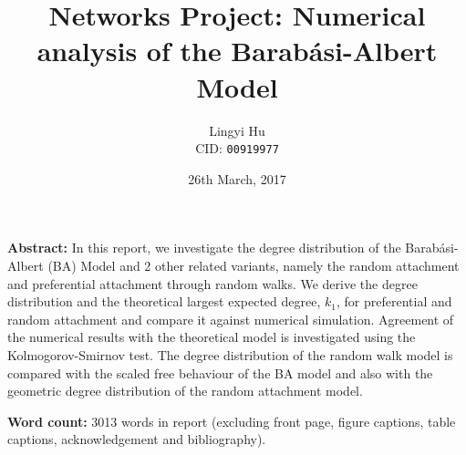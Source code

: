 


\title{Networks Project: Numerical analysis of the Barab\'asi-Albert Model}
\date{26th March, 2017}
\author{Lingyi Hu\\ CID: \texttt{00919977}}
\maketitle

\vspace*{2cm}
\noindent
{\bf Abstract:} In this report, we investigate the degree distribution of the Barab\'asi-Albert (BA) Model and 2 other related variants, namely the random attachment and preferential attachment through random walks. We derive the degree distribution and the theoretical largest expected degree, $k_1$, for preferential and random attachment and compare it against numerical simulation. Agreement of the numerical results with the theoretical model is investigated using the Kolmogorov-Smirnov test. The degree distribution of the random walk model is compared with the scaled free behaviour of the BA model and also with the geometric degree distribution of the random attachment model. 


\vspace*{2cm}
\noindent
{\bf Word count:}
3013 words in report (excluding front page, figure captions, table captions, acknowledgement and bibliography).


\newpage





\newpage
\noindent
\vspace*{2cm}

\printbibliography[heading=bibintoc]


